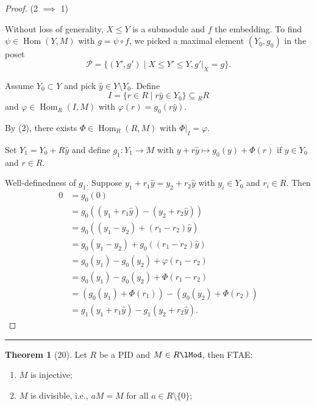 \documentclass[12pt]{article}
\newcommand{\sepline}{\rule{\textwidth}{0.4pt}}
\theoremstyle{definition}
\newtheorem{theorem}{Theorem}
\renewcommand{\phi}{\varphi}
\newcommand{\<}{\left\langle}
\renewcommand{\>}{\right\rangle}
\newcommand{\seq}{\subseteq}
\DeclareMathOperator{\Hom}{Hom}
\renewcommand{\hat}{\widehat}
\renewcommand{\_}[1]{{_{#1}}}
\begin{document}
\begin{proof}
    (2 $\implies$ 1)

    Without loss of generality, $X \leq Y$ is a submodule and $f$ the embedding.
    To find $\psi \in \Hom(Y, M)$ with $g = \psi \circ f$, we picked a maximal element $(Y_0, g_0)$ in the poset
    \[
        \mathcal{P} = \{(Y', g') \mid X \leq Y' \leq Y, g'|_X = g\}.
    \]

    Assume $Y_0 \subset Y$ and pick $\hat{y} \in Y \setminus Y_0$.
    Define
    \[
        I = \{r \in R \mid r\hat{y} \in Y_0\} \seq \_RR
    \]
    and $\phi \in \Hom_R(I, M)$ with $\phi(r) = g_0(r\hat{y})$.

    By (2), there exists $\Phi \in \Hom_R(R, M)$ with $\Phi|_I = \phi$.

    Set $Y_1 = Y_0 + R\hat{y}$ and define $g_1 : Y_1 \to M$ with $y + r\hat{y} \mapsto g_0(y) + \Phi(r)$ if $y \in Y_0$ and $r \in R$.

    Well-definedness of $g_1$.
    Suppose $y_1 + r_1\hat{y} = y_2 + r_2\hat{y}$ with $y_i \in Y_0$ and $r_i \in R$.
    Then
    \begin{align*}
        0 
            &= g_0(0) \\
            &= g_0((y_1 + r_1\hat{y}) - (y_2 + r_2\hat{y})) \\
            &= g_0((y_1 - y_2) + (r_1 - r_2)\hat{y}) \\
            &= g_0(y_1 - y_2) + g_0((r_1 - r_2)\hat{y}) \\
            &= g_0(y_1) - g_0(y_2) + \phi(r_1 - r_2) \\
            &= g_0(y_1) - g_0(y_2) +\Phi(r_1 - r_2) \\
            &= (g_0(y_1) + \Phi(r_1)) - (g_0(y_2) + \Phi(r_2)) \\
            &= g_1(y_1 + r_1\hat{y}) - g_1(y_2 + r_2\hat{y}).
    \end{align*}
\end{proof}

\sepline

\begin{theorem}[20]
    Let $R$ be a PID and $M \in R\lMod$, then FTAE:
    \begin{enumerate}[(1)]
        \item $M$ is injective;
        \item $M$ is divisible, i.e., $aM = M$ for all $a \in R \setminus \{0\}$;
    \end{enumerate}
\end{theorem}
\end{document}
